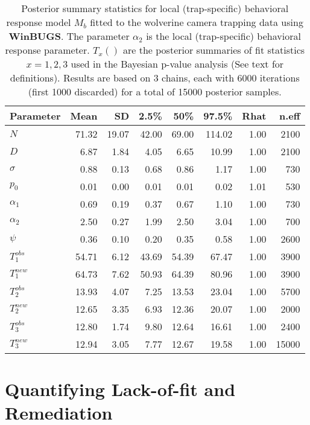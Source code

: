 {\begin{table}[ht]
\centering
\caption{
Posterior summary statistics for local (trap-specific) behavioral
response model $M_{b}$ fitted to the wolverine camera trapping data
using {\bf WinBUGS}. The parameter $\alpha_{2}$ is the local
(trap-specific) behavioral
response parameter. $T_{x}()$ are the posterior summaries of fit
statistics $x=1,2,3$ used in the Bayesian p-value analysis (See text for
definitions). Results are based on
 3 chains, each with 6000 iterations (first 1000 discarded) for a
 total of 15000 posterior samples. 
}
\begin{tabular}{lrrrrrrr} \hline \hline 
Parameter   & Mean  & SD  & 2.5\% & 50\% & 97.5\% & Rhat &n.eff \\ \hline
$N$          & 71.32 &19.07 &42.00 &69.00 &114.02 &1.00  &2100 \\
$D$          &  6.87 & 1.84 & 4.05 & 6.65 & 10.99 &1.00  &2100\\ \hline
$\sigma$    &  0.88 & 0.13 & 0.68 & 0.86 & 1.17  &1.00  & 730 \\
$p_0$        &  0.01 & 0.00 & 0.01 & 0.01 & 0.02  &1.01  & 530\\
$\alpha_1$   &  0.69 & 0.19 & 0.37 & 0.67 &  1.10 &1.00  & 730\\
$\alpha_2$   &  2.50 & 0.27 & 1.99 & 2.50 &  3.04 &1.00  & 700\\
$\psi$       &  0.36 & 0.10 & 0.20 & 0.35 & 0.58  &1.00  &2600  \\
$T_{1}^{obs}$  & 54.71 & 6.12 &43.69 &54.39 & 67.47 &1.00  &3900\\
$T_{1}^{new}$  & 64.73 & 7.62 &50.93 &64.39 & 80.96 &1.00  &3900\\
$T_{2}^{obs}$  & 13.93 & 4.07 & 7.25 &13.53 & 23.04 &1.00  &5700\\
$T_{2}^{new}$  & 12.65 & 3.35 & 6.93 &12.36 & 20.07 &1.00  &2000\\
$T_{3}^{obs}$  & 12.80 & 1.74 & 9.80 &12.64 & 16.61 &1.00  &2400\\
$T_{3}^{new}$  & 12.94 & 3.05 & 7.77 &12.67 & 19.58 &1.00 &15000\\ \hline
\end{tabular}
\label{gof.tab.wolvMb}
\end{table}

\section{Quantifying Lack-of-fit and Remediation}

}
